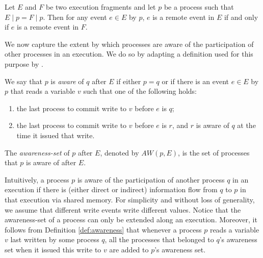 \begin{fact}
	Let $E$ and $F$ be two execution fragments and let $p$ be a process such that $E \mid p = F \mid p$. Then for any event $e \in E$ by $p$, $e$ is a remote event in $E$ if and only if $e$ is a remote event in $F$.
\end{fact}

We now capture the extent by which processes are aware of the participation of other processes in an execution. We do so by adapting a definition used for this purpose by \cite{Attiya05timeand}.

\begin{definition}
	We say that $p$ is \emph{aware} of $q$ after $E$ if either $p=q$ or if there is an event $e \in E$ by $p$ that reads a variable $v$ such that one of the following holds:
	\begin{enumerate}
		\item the last process to commit write to $v$ before $e$ is $q$;
		\item the last process to commit write to $v$ before $e$ is $r$, and $r$ is aware of $q$ at the time it issued that write.
	\end{enumerate}
The \emph{awareness-set} of $p$ after $E$, denoted by $AW(p,E)$, is the set of processes that $p$ is aware of after $E$.
\label{def:awareness}
\end{definition}

Intuitively, a process $p$ is aware of the participation of another process $q$ in an execution if there is (either direct or indirect) information flow from $q$ to $p$ in that execution via shared memory. For simplicity and without loss of generality, we assume that different write events write different values. Notice that the awareness-set of a process can only be extended along an execution. Moreover, it follows from Definition \ref{def:awareness} that whenever a process $p$ reads a variable $v$ last written by some process $q$, all the processes that belonged to $q$'s awareness set when it issued this write to $v$ are added to $p$'s awareness set.

\begin{comment} %
We consider a model in which all the writes (to both local and remote variables) are placed in the write buffer. Our proof, on the other hand, relies only on the assumption that all writes to remote variables may be delayed until a fence is performed, thus the same construction can be used in a model where operations to local variable are committed instantly (at the time they are issued). In such a model, a process is allowed to perform any powerful operation on its local variables (such as CAS and swap). A closer inspection of the construction reviles that we do not interleave local events of different processes, thus any powerful operation can be seen as an atomic serious of reads and writes, and the same proof holds.
\end{comment}

